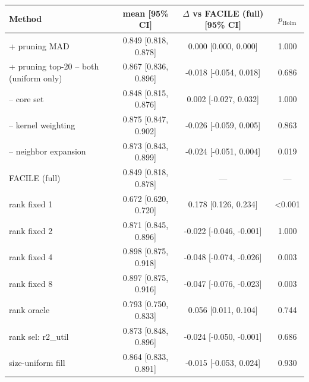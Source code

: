 \begin{tabular}{lccc}
\toprule
Method & mean [95\% CI] & $\Delta$ vs FACILE (full) [95\% CI] & $p_{\mathrm{Holm}}$ \\
\midrule
+ pruning MAD & 0.849 [0.818, 0.878] & 0.000 [0.000, 0.000] & 1.000 \\
+ pruning top-20%
-- both (uniform only) & 0.867 [0.836, 0.896] & -0.018 [-0.054, 0.018] & 0.686 \\
-- core set & 0.848 [0.815, 0.876] & 0.002 [-0.027, 0.032] & 1.000 \\
-- kernel weighting & 0.875 [0.847, 0.902] & -0.026 [-0.059, 0.005] & 0.863 \\
-- neighbor expansion & 0.873 [0.843, 0.899] & -0.024 [-0.051, 0.004] & 0.019 \\
FACILE (full) & 0.849 [0.818, 0.878] & --- & --- \\
rank fixed 1 & 0.672 [0.620, 0.720] & 0.178 [0.126, 0.234] & <0.001 \\
rank fixed 2 & 0.871 [0.845, 0.896] & -0.022 [-0.046, -0.001] & 1.000 \\
rank fixed 4 & 0.898 [0.875, 0.918] & -0.048 [-0.074, -0.026] & 0.003 \\
rank fixed 8 & 0.897 [0.875, 0.916] & -0.047 [-0.076, -0.023] & 0.003 \\
rank oracle & 0.793 [0.750, 0.833] & 0.056 [0.011, 0.104] & 0.744 \\
rank sel: r2_util & 0.873 [0.848, 0.896] & -0.024 [-0.050, -0.001] & 0.686 \\
size-uniform fill & 0.864 [0.833, 0.891] & -0.015 [-0.053, 0.024] & 0.930 \\
\bottomrule
\end{tabular}


